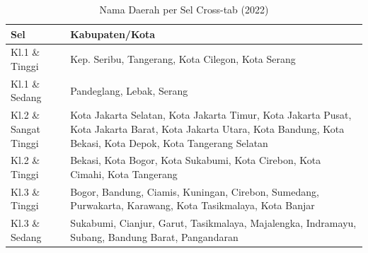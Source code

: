 \begin{table}[H]
\centering
\small
\caption{Nama Daerah per Sel Cross-tab (2022)} \label{tab:crossname2022}
\begin{tabular}{|>{\raggedright\arraybackslash}m{}|>{\raggedright\arraybackslash}m{}|}
\hline
\textbf{Sel} & \textbf{Kabupaten/Kota} \\
\hline
Kl.1 \& Tinggi & Kep. Seribu, Tangerang, Kota Cilegon, Kota Serang \\
\hline
Kl.1 \& Sedang & Pandeglang, Lebak, Serang \\
\hline
Kl.2 \& Sangat Tinggi & Kota Jakarta Selatan, Kota Jakarta Timur, Kota Jakarta Pusat, Kota Jakarta Barat, Kota Jakarta Utara, Kota Bandung, Kota Bekasi, Kota Depok, Kota Tangerang Selatan \\
\hline
Kl.2 \& Tinggi & Bekasi, Kota Bogor, Kota Sukabumi, Kota Cirebon, Kota Cimahi, Kota Tangerang \\
\hline
Kl.3 \& Tinggi & Bogor, Bandung, Ciamis, Kuningan, Cirebon, Sumedang, Purwakarta, Karawang, Kota Tasikmalaya, Kota Banjar \\
\hline
Kl.3 \& Sedang & Sukabumi, Cianjur, Garut, Tasikmalaya, Majalengka, Indramayu, Subang, Bandung Barat, Pangandaran \\
\hline
\end{tabular}
\end{table}